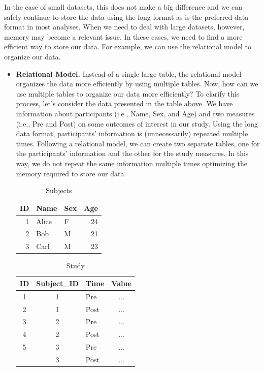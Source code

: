 \documentclass[
  11pt,
]{book}
\begin{document}
In the case of small datasets, this does not make a big difference and we can safely continue to store the data using the long format as is the preferred data format in most analyses. When we need to deal with large datasets, however, memory may become a relevant issue. In these cases, we need to find a more efficient way to store our data. For example, we can use the relational model to organize our data.

\begin{itemize}
\item
  \textbf{Relational Model.} Instead of a single large table, the relational model organizes the data more efficiently by using multiple tables. Now, how can we use multiple tables to organize our data more efficiently? To clarify this process, let's consider the data presented in the table above. We have information about participants (i.e., Name, Sex, and Age) and two measures (i.e., Pre and Post) on some outcomes of interest in our study. Using the long data format, participants' information is (unnecessarily) repeated multiple times. Following a relational model, we can create two separate tables, one for the participants' information and the other for the study measures. In this way, we do not repeat the same information multiple times optimizing the memory required to store our data.

  \begin{table}[!h]

    \caption{\label{tab:unnamed-chunk-18}Subjects}
    \centering
    \begin{tabular}[t]{rllr}
    \toprule
    ID & Name & Sex & Age\\
    \midrule
    1 & Alice & F & 24\\
    2 & Bob & M & 21\\
    3 & Carl & M & 23\\
    \bottomrule
    \end{tabular}
    \end{table}

  \begin{table}[!h]

    \caption{\label{tab:unnamed-chunk-18}Study}
    \centering
    \begin{tabular}[t]{cclc}
    \toprule
    ID & Subject\_ID & Time & Value\\
    \midrule
    1 & 1 & Pre & ...\\
    2 & 1 & Post & ...\\
    3 & 2 & Pre & ...\\
    4 & 2 & Post & ...\\
    5 & 3 & Pre & ...\\
    \addlinespace
    6 & 3 & Post & ...\\
    \bottomrule
    \end{tabular}
    \end{table}


\end{itemize}
\end{document}
